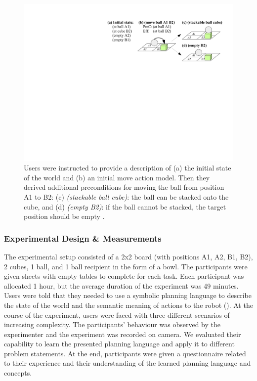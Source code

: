 \begin{figure}
	\centering
	\includegraphics[width=\linewidth]{Fig10.pdf}
	\caption{Users were instructed to provide a description of (a) the initial state of the world and (b) an initial move action model.
		Then they derived additional preconditions for moving the ball from position A1 to B2: (c) \textit{(stackable ball cube)}: the ball can be stacked onto the cube, and (d) \textit{(empty B2)}: if the ball cannot be stacked, the target position should be empty \cite{liang2017b}.}
	\label{fig:scenarios-exp1}
\end{figure}

\subsubsection{Experimental Design \& Measurements}
The experimental setup consisted of a 2x2 board (with positions A1, A2, B1, B2), 2 cubes, 1 ball, and 1 ball recipient in the form of a bowl.
The participants were given sheets with empty tables to complete for each task.
Each participant was allocated 1 hour, but the average duration of the experiment was 49 minutes.
Users were told that they needed to use a symbolic planning language to describe the state of the world and the semantic meaning of actions to the robot (). 
At the course of the experiment, users were faced with three different scenarios of increasing complexity. 
The participants' behaviour was observed by the experimenter and the experiment was recorded on camera.
We evaluated their capability to learn the presented planning language and apply it to different problem statements.
At the end, participants were given a questionnaire related to their experience and their understanding of the learned planning language and concepts.

